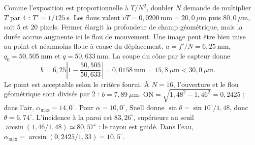 Comme l'exposition est proportionnelle à $T/N^2$, doubler $N$ demande de multiplier $T$ par 4 : $T'=1/125\ \mathrm{s}$. Les flous valent $vT=0{,}0200\ \mathrm{mm}=20{,}0\ \mu\mathrm{m}$ puis $80{,}0\ \mu\mathrm{m}$, soit 5 et 20 pixels.
Fermer élargit la profondeur de champ géométrique, mais la durée accrue augmente ici le flou de mouvement. Une image peut être bien mise au point et néanmoins floue à cause du déplacement.
$a=f'/N=6{,}25\ \mathrm{mm}$, $q_0=50{,}505\ \mathrm{mm}$ et $q=50{,}633\ \mathrm{mm}$. La coupe du cône par le capteur donne
\[b=6{,}25\left|1-\frac{50{,}505}{50{,}633}\right|
=0{,}0158\ \mathrm{mm}=15{,}8\ \mu\mathrm{m}<30{,}0\ \mu\mathrm{m}.\]
Le point est acceptable selon le critère fourni. À $N=16$, l'ouverture et le flou géométrique sont divisés par 2 : $b=7{,}89\ \mu\mathrm{m}$.
$\mathrm{ON}=\sqrt{1{,}48^2-1{,}46^2}=0{,}2425$ ; dans l'air, $\alpha_{\max}=14{,}0^\circ$. Pour $\alpha=10{,}0^\circ$, Snell donne $\sin\theta=\sin10^\circ/1{,}48$, donc $\theta=6{,}74^\circ$. L'incidence à la paroi est $83{,}26^\circ$, supérieure au seuil $\arcsin(1{,}46/1{,}48)\simeq80{,}57^\circ$ : le rayon est guidé. Dans l'eau, $\alpha_{\max}=\arcsin(0{,}2425/1{,}33)=10{,}5^\circ$.

